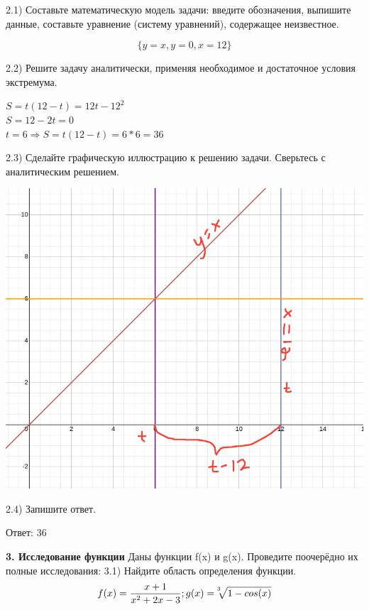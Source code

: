 \documentclass{article}
\begin{document}
\large{
2.1) Составьте математическую модель задачи: введите обозначения, выпишите данные, составьте уравнение (систему уравнений), содержащее неизвестное.
}
\linebreak

$$\{y = x, y = 0, x = 12\}$$
\linebreak

\large{2.2) Решите задачу аналитически, применяя необходимое и достаточное условия экстремума.}
\linebreak

\begin{center}

$S = t(12 - t) = 12t - 12^2$
\\
$S = 12 - 2t = 0$
\\
$t = 6 \Rightarrow S = t(12 - t) = 6 * 6 = 36$

\end{center}

\newpage

\large{2.3) Сделайте графическую иллюстрацию к решению задачи. Сверьтесь с аналитическим
решением.}
\linebreak


\includegraphics[scale=0.45]{pic1.png}
\linebreak

\large{2.4) Запишите ответ.}
\linebreak

Ответ: 36
\linebreak

\LARGE\textbf{3. Исследование функции}
\linebreak\linebreak
\Large{Даны функции f(x) и g(x). Проведите поочерёдно их полные исследования:}
\linebreak\linebreak
\large{3.1) Найдите область определения функции.}
$$f(x) = \frac{x + 1}{x^2 + 2x - 3} ; g(x) = \sqrt[\leftroot{5} \uproot{3} 3]{1 - cos(x)} $$
\end{document}
